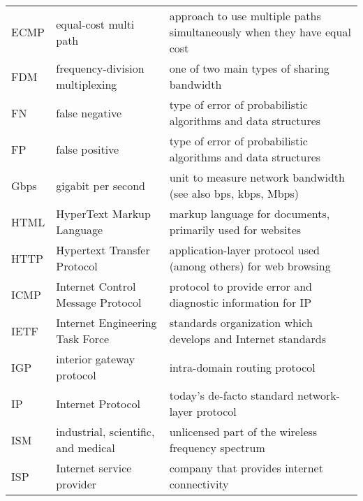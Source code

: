\begin{longtable}{p{1.7cm} | p{5cm} | p{8cm}}
    ECMP    & equal-cost multi path                       & approach to use multiple paths simultaneously when they have equal cost                             \\
    FDM     & frequency-division multiplexing             & one of two main types of sharing bandwidth                                                          \\
    FN      & false negative                              & type of error of probabilistic algorithms and data structures                                       \\
    FP      & false positive                              & type of error of probabilistic algorithms and data structures                                       \\
    Gbps    & gigabit per second                          & unit to measure network bandwidth (see also bps, kbps, Mbps)                                        \\
    HTML    & HyperText Markup Language                   & markup language for documents, primarily used for websites                                          \\
    HTTP    & Hypertext Transfer Protocol                 & application-layer protocol used (among others) for web browsing                                     \\
    ICMP    & Internet Control Message Protocol           & protocol to provide error and diagnostic information for IP                                         \\
    IETF    & Internet Engineering Task Force             & standards organization which develops and Internet standards                                        \\
    IGP     & interior gateway protocol                   & intra-domain routing protocol                                                                       \\
    IP      & Internet Protocol                           & today's de-facto standard network-layer protocol                                                    \\
    ISM     & industrial, scientific, and medical         & unlicensed part of the wireless frequency spectrum                                                  \\
    ISP     & Internet service provider                   & company that provides internet connectivity                                                         \\

\end{longtable}
